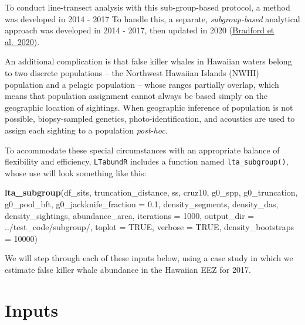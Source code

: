 \documentclass[
]{book}
\newenvironment{Shaded}{\begin{snugshade}}{\end{snugshade}}
\newcommand{\AttributeTok}[1]{\textcolor[rgb]{0.13,0.29,0.53}{#1}}
\newcommand{\ConstantTok}[1]{\textcolor[rgb]{0.56,0.35,0.01}{#1}}
\newcommand{\DecValTok}[1]{\textcolor[rgb]{0.00,0.00,0.81}{#1}}
\newcommand{\FloatTok}[1]{\textcolor[rgb]{0.00,0.00,0.81}{#1}}
\newcommand{\FunctionTok}[1]{\textcolor[rgb]{0.13,0.29,0.53}{\textbf{#1}}}
\newcommand{\NormalTok}[1]{#1}
\newcommand{\StringTok}[1]{\textcolor[rgb]{0.31,0.60,0.02}{#1}}
\begin{document}
To conduct line-transect analysis with this sub-group-based protocol, a method was developed in 2014 - 2017
To handle this, a separate, \emph{subgroup-based} analytical approach was developed in 2014 - 2017, then updated in 2020 (\href{https://www.fisheries.noaa.gov/inport/item/59592}{Bradford et al.~2020}).

An additional complication is that false killer whales in Hawaiian waters belong to two discrete populations -- the Northwest Hawaiian Islands (NWHI) population and a pelagic population -- whose ranges partially overlap, which means that population assignment cannot always be based simply on the geographic location of sightings. When geographic inference of population is not possible, biopsy-sampled genetics, photo-identification, and acoustics are used to assign each sighting to a population \emph{post-hoc}.

To accommodate these special circumstances with an appropriate balance of flexibility and efficiency, \texttt{LTabundR} includes a function named \texttt{lta\_subgroup()}, whose use will look something like this:

\begin{Shaded}
\begin{Highlighting}[]
\FunctionTok{lta\_subgroup}\NormalTok{(df\_sits,}
\NormalTok{             truncation\_distance,}
\NormalTok{             ss,}
\NormalTok{             cruz10,}
\NormalTok{             g0\_spp,}
\NormalTok{             g0\_truncation,}
\NormalTok{             g0\_pool\_bft,}
             \AttributeTok{g0\_jackknife\_fraction =} \FloatTok{0.1}\NormalTok{,}
\NormalTok{             density\_segments,}
\NormalTok{             density\_das,}
\NormalTok{             density\_sightings,}
\NormalTok{             abundance\_area,}
             \AttributeTok{iterations =} \DecValTok{1000}\NormalTok{,}
             \AttributeTok{output\_dir =} \StringTok{\textquotesingle{}../test\_code/subgroup/\textquotesingle{}}\NormalTok{,}
             \AttributeTok{toplot =} \ConstantTok{TRUE}\NormalTok{,}
             \AttributeTok{verbose =} \ConstantTok{TRUE}\NormalTok{,}
             \AttributeTok{density\_bootstraps =} \DecValTok{10000}\NormalTok{)}
\end{Highlighting}
\end{Shaded}

We will step through each of these inputs below, using a case study in which we estimate false killer whale abundance in the Hawaiian EEZ for 2017.

\hypertarget{inputs-1}{%
\section*{Inputs}\label{inputs-1}}
\end{document}
